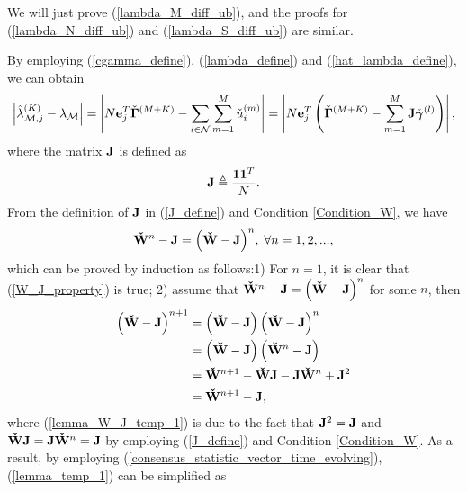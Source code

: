 \documentclass[11pt, draftclsnofoot, onecolumn]{IEEEtran}
\newcommand{\cM}{\mathcal{M}}
\newcommand{\cbgamma}{{\check{\boldsymbol{\gamma}}}}
\newcommand{\cbGamma}{{\check{\boldsymbol{\Gamma}}}}
\newcommand{\cu}{{\check{u}}}
\newcommand{\cW}{{\check{W}}}
\begin{document}
We will just prove (\ref{lambda_M_diff_ub}), and the   proofs for (\ref{lambda_N_diff_ub}) and (\ref{lambda_S_diff_ub}) are similar.  

By employing (\ref{cgamma_define}), (\ref{lambda_define}) and (\ref{hat_lambda_define}), we can obtain
\begin{equation} \label{lemma_temp_1}
\left| {\hat \lambda _{{\cal M},j}^{(K)} - {\lambda _{\cM}}} \right| = \left| {N{\bf{e}}_j^T{\cbGamma ^{\left( {M + K} \right)}} - \sum\limits_{i \in {\cal N}} {\sum\limits_{m = 1}^M {\cu_i^{(m)}} } } \right| = \left| {N{\bf{e}}_j^T\left( {{\cbGamma ^{\left( {M + K} \right)}} - \sum\limits_{m = 1}^M {{\bf{J}}{\cbgamma ^{(l)}}} } \right)} \right|,
\end{equation}	
where the matrix $\bf J$ is defined as
\begin{equation} \label{J_define}
{\bf J} \triangleq \frac{{\bf 1} {\bf 1}^T}{N}.
\end{equation}
From the definition of $\bf J$ in (\ref{J_define}) and Condition \ref{Condition_W}, we have
\begin{equation} \label{W_J_property}
{{\bf{\cW}}^n} - {\bf{J}} = {\left( {{\bf{\cW}} - {\bf{J}}} \right)^n}, \; \forall n=1,2,...,
\end{equation}
which can be proved by induction as follows:1) For $n=1$, it is clear that (\ref{W_J_property}) is true; 2) assume that ${{\bf{\cW}}^n} - {\bf{J}} = {\left( {{\bf{\cW}} - {\bf{J}}} \right)^n}$ for some $n$, then
\begin{align} \notag
{\left( {{\bf{\cW}} - {\bf{J}}} \right)^{n + 1}} & = \left( {{\bf{\cW}} - {\bf{J}}} \right){\left( {{\bf{\cW}} - {\bf{J}}} \right)^n}\\  \notag
& = \left( {{\bf{\cW}} - {\bf{J}}} \right)\left( {{{\bf{\cW}}^n} - {\bf{J}}} \right)\\  \notag
& = {{\bf{\cW}}^{n + 1}} - {\bf{\cW J}} - {\bf{J}}{{\bf{\cW}}^n} + {{\bf{J}}^2}\\ \label{lemma_W_J_temp_1}
& = {{\bf{\cW}}^{n + 1}} - {\bf{J}},
\end{align}
where (\ref{lemma_W_J_temp_1}) is due to the fact that ${{\bf{J}}^2} = {\bf{J}}$ and ${\bf{\cW J}} = {\bf{J}}{{\bf{\cW}}^n} = {\bf{J}}$ by employing (\ref{J_define}) and Condition \ref{Condition_W}. As a result, by employing (\ref{consensus_statistic_vector_time_evolving}),  (\ref{lemma_temp_1}) can be simplified as
\end{document}
